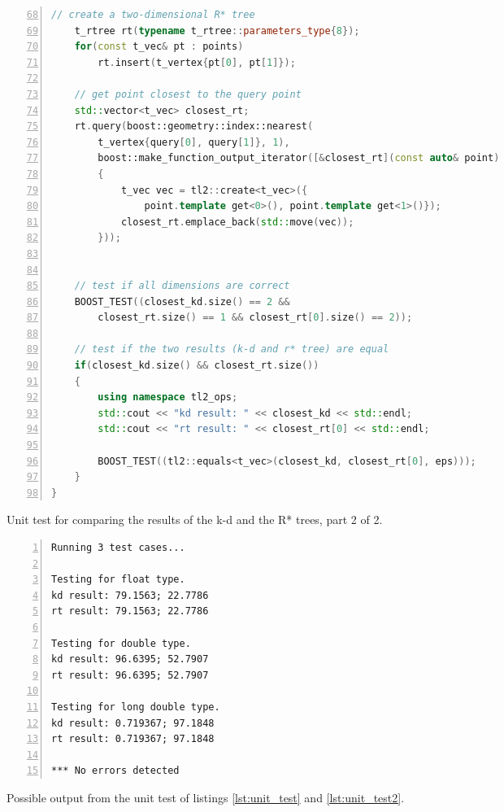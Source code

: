 \begin{listing}[htb]
	\begin{lstlisting}[language = C++,
			basicstyle = {\scriptsize},
			breaklines = true, tabsize = 4,
			numbers = left, firstnumber = 68, numberstyle={\scriptsize}]
	// create a two-dimensional R* tree
	t_rtree rt(typename t_rtree::parameters_type{8});
	for(const t_vec& pt : points)
		rt.insert(t_vertex{pt[0], pt[1]});

	// get point closest to the query point
	std::vector<t_vec> closest_rt;
	rt.query(boost::geometry::index::nearest(
		t_vertex{query[0], query[1]}, 1),
		boost::make_function_output_iterator([&closest_rt](const auto& point)
		{
			t_vec vec = tl2::create<t_vec>({
				point.template get<0>(), point.template get<1>()});
			closest_rt.emplace_back(std::move(vec));
		}));


	// test if all dimensions are correct
	BOOST_TEST((closest_kd.size() == 2 &&
		closest_rt.size() == 1 && closest_rt[0].size() == 2));

	// test if the two results (k-d and r* tree) are equal
	if(closest_kd.size() && closest_rt.size())
	{
		using namespace tl2_ops;
		std::cout << "kd result: " << closest_kd << std::endl;
		std::cout << "rt result: " << closest_rt[0] << std::endl;

		BOOST_TEST((tl2::equals<t_vec>(closest_kd, closest_rt[0], eps)));
	}
}
	\end{lstlisting}
	\caption[Unit test 2/2.]{Unit test for comparing the results of the k-d and the R* trees, part 2 of 2.
	\label{lst:unit_test2}}
\end{listing}


\begin{listing}[htb]
	\begin{lstlisting}[basicstyle = {\scriptsize},
			breaklines = true, tabsize = 4,
			numbers = left, numberstyle={\scriptsize}]
Running 3 test cases...

Testing for float type.
kd result: 79.1563; 22.7786
rt result: 79.1563; 22.7786

Testing for double type.
kd result: 96.6395; 52.7907
rt result: 96.6395; 52.7907

Testing for long double type.
kd result: 0.719367; 97.1848
rt result: 0.719367; 97.1848

*** No errors detected
	\end{lstlisting}
	\caption[Unit test output.]{Possible output from the unit test of listings \ref{lst:unit_test} and \ref{lst:unit_test2}.
	\label{lst:unit_test_output}}
\end{listing}

